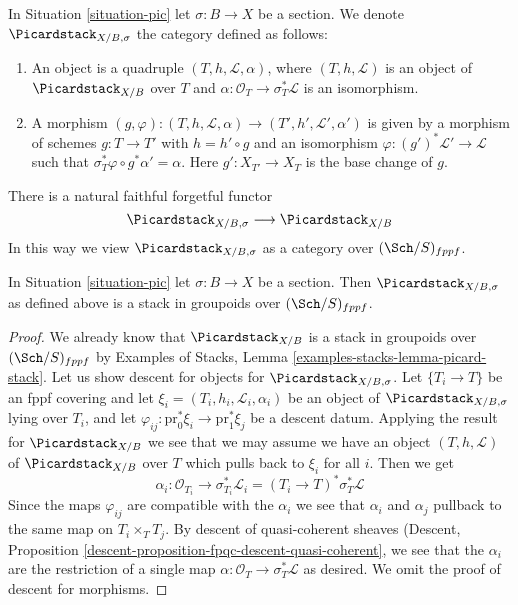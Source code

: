 \noindent
In Situation \ref{situation-pic} let $\sigma : B \to X$ be a section.
We denote $\Picardstack_{X/B, \sigma}$ the category defined as follows:
\begin{enumerate}
\item An object is a quadruple $(T, h, \mathcal{L}, \alpha)$, where
$(T, h, \mathcal{L})$ is an object of $\Picardstack_{X/B}$ over $T$ and
$\alpha : \mathcal{O}_T \to \sigma_T^*\mathcal{L}$
is an isomorphism.
\item A morphism $(g, \varphi) : (T, h, \mathcal{L}, \alpha)
\to (T', h', \mathcal{L}', \alpha')$
is given by a morphism of schemes $g : T \to T'$ with $h = h' \circ g$
and an isomorphism $\varphi : (g')^*\mathcal{L}' \to \mathcal{L}$
such that $\sigma_T^*\varphi \circ g^*\alpha' = \alpha$.
Here $g' : X_{T'} \to X_T$ is the base change of $g$.
\end{enumerate}
There is a natural faithful forgetful functor
$$
\Picardstack_{X/B, \sigma} \longrightarrow
\Picardstack_{X/B}
$$
In this way we view $\Picardstack_{X/B, \sigma}$ as a category
over $(\Sch/S)_{fppf}$.

\begin{lemma}
\label{lemma-pic-with-section-stack}
In Situation \ref{situation-pic} let $\sigma : B \to X$ be a section.
Then $\Picardstack_{X/B, \sigma}$ as defined above is a stack in
groupoids over $(\Sch/S)_{fppf}$.
\end{lemma}

\begin{proof}
We already know that $\Picardstack_{X/B}$ is a stack in groupoids
over $(\Sch/S)_{fppf}$ by
Examples of Stacks, Lemma \ref{examples-stacks-lemma-picard-stack}.
Let us show descent for objects for $\Picardstack_{X/B, \sigma}$.
Let $\{T_i \to T\}$ be an fppf covering and let
$\xi_i = (T_i, h_i, \mathcal{L}_i, \alpha_i)$ be an object of
$\Picardstack_{X/B, \sigma}$ lying over $T_i$, and let
$\varphi_{ij} : \text{pr}_0^*\xi_i \to \text{pr}_1^*\xi_j$
be a descent datum. Applying the result for $\Picardstack_{X/B}$
we see that we may assume we have an object $(T, h, \mathcal{L})$
of $\Picardstack_{X/B}$ over $T$ which pulls back to $\xi_i$ for all $i$.
Then we get
$$
\alpha_i : \mathcal{O}_{T_i} \to \sigma_{T_i}^*\mathcal{L}_i =
(T_i \to T)^*\sigma_T^*\mathcal{L}
$$
Since the maps $\varphi_{ij}$ are compatible with the $\alpha_i$
we see that $\alpha_i$ and $\alpha_j$ pullback to the same map
on $T_i \times_T T_j$. By descent of quasi-coherent sheaves
(Descent, Proposition \ref{descent-proposition-fpqc-descent-quasi-coherent},
we see that the $\alpha_i$ are the restriction of a single map
$\alpha : \mathcal{O}_T \to \sigma_T^*\mathcal{L}$ as desired.
We omit the proof of descent for morphisms.
\end{proof}


